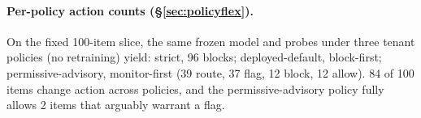 \documentclass[11pt]{article}
\begin{document}
\paragraph{Per-policy action counts (\S\ref{sec:policyflex}).} On the fixed 100-item slice, the same frozen model and probes under three tenant policies (no retraining) yield: strict, 96 blocks; deployed-default, block-first; permissive-advisory, monitor-first (39 route, 37 flag, 12 block, 12 allow). 84 of 100 items change action across policies, and the permissive-advisory policy fully allows 2 items that arguably warrant a flag.
\end{document}
